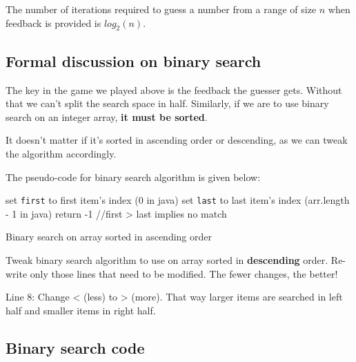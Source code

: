 The number of iterations required to guess a number from a range of size $n$ when feedback is provided is $log_2(n)$.

\subsection{Formal discussion on binary search}

The key in the game we played above is the feedback the guesser gets. Without that we can't split the search space in half.
Similarly, if we are to use binary search on an integer array, \textbf{it must be sorted}. 

It doesn't matter if it's sorted in ascending order or descending, as we can tweak the algorithm accordingly.

The pseudo-code for binary search algorithm is given below:

\IncMargin{1em}
\begin{algorithm}[H]
	\SetAlgoLined
{}
set \texttt{first} to first item's index (0 in java)\;
set \texttt{last} to last item's index (arr.length - 1 in java)\;
return -1 //first > last implies no match\;
\caption{Binary search on array sorted in ascending order \label{bs}}
\end{algorithm}

\begin{exercise}
Tweak binary search algorithm to use on array sorted in \textbf{descending} order. Re-write only those lines that need to be modified. The fewer changes, the better!
\end{exercise}
\begin{answer}
Line 8: Change < (less) to >	 (more). That way larger items are searched in left half and smaller items in right half.
\end{answer}

\newpage
\subsection{Binary search code}

